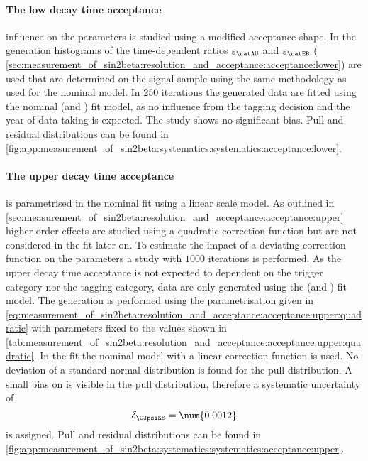 \paragraph{The low decay time acceptance} influence on the \CP parameters is
studied using a modified acceptance shape. In the generation histograms of the
time-dependent ratios $\varepsilon_{\catAU}$ and $\varepsilon_{\catEB}$ (\cf
\cref{sec:measurement_of_sin2beta:resolution_and_acceptance:acceptance:lower})
are used that are determined on the signal \MC sample using the same methodology
as used for the nominal model. In $\num{250}$ iterations the generated data are
fitted using the nominal (\catOT and \catOS) fit model, as no influence from the
tagging decision and the year of data taking is expected. The \ToyMC study shows
no significant bias. Pull and residual distributions can be found
in
\cref{fig:app:measurement_of_sin2beta:systematics:systematics:acceptance:lower}.

\paragraph{The upper decay time acceptance} is parametrised in the nominal fit
using a linear scale model. As outlined in
\cref{sec:measurement_of_sin2beta:resolution_and_acceptance:acceptance:upper}
higher order effects are studied using a quadratic correction function but are
not considered in the fit later on. To estimate the impact of a deviating
correction function on the \CP parameters a \ToyMC study with $\num{1000}$
iterations is performed. As the upper decay time acceptance is not expected to
dependent on the trigger category nor the tagging category, data are only
generated using the (\catAU and \catOS) fit model. The generation is performed
using the parametrisation given in \cref{eq:measurement_of_sin2beta:resolution_and_acceptance:acceptance:upper:quadratic} 
with parameters fixed to the values shown in
\cref{tab:measurement_of_sin2beta:resolution_and_acceptance:acceptance:upper:quadratic}. 
In the fit the nominal model with a linear correction function is used. No
deviation of a standard normal distribution is found for the \SJpsiKS pull
distribution. A small bias on \CJpsiKS is visible in the pull distribution,
therefore a systematic uncertainty of
%
\begin{equation}
  \delta_{\CJpsiKS} = \num{0.0012}
\end{equation}
%
is assigned. Pull and residual distributions can be found in
\cref{fig:app:measurement_of_sin2beta:systematics:systematics:acceptance:upper}.

